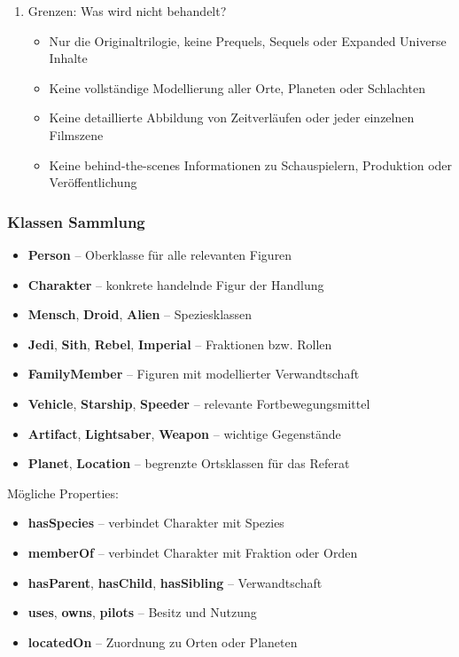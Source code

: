 \documentclass[a4paper]{article}
\begin{document}
\begin{enumerate}
        \item Grenzen: Was wird nicht behandelt? 
        
        \begin{itemize}
            \item Nur die Originaltrilogie, keine Prequels, Sequels oder Expanded Universe Inhalte
            \item Keine vollständige Modellierung aller Orte, Planeten oder Schlachten
            \item Keine detaillierte Abbildung von Zeitverläufen oder jeder einzelnen Filmszene
            \item Keine behind-the-scenes Informationen zu Schauspielern, Produktion oder Veröffentlichung
        \end{itemize}

    \end{enumerate}

\subsubsection{Klassen Sammlung}

\begin{itemize}
    \item \textbf{Person} -- Oberklasse für alle relevanten Figuren
    \item \textbf{Charakter} -- konkrete handelnde Figur der Handlung
    \item \textbf{Mensch}, \textbf{Droid}, \textbf{Alien} -- Speziesklassen
    \item \textbf{Jedi}, \textbf{Sith}, \textbf{Rebel}, \textbf{Imperial} -- Fraktionen bzw. Rollen
    \item \textbf{FamilyMember} -- Figuren mit modellierter Verwandtschaft
    \item \textbf{Vehicle}, \textbf{Starship}, \textbf{Speeder} -- relevante Fortbewegungsmittel
    \item \textbf{Artifact}, \textbf{Lightsaber}, \textbf{Weapon} -- wichtige Gegenstände
    \item \textbf{Planet}, \textbf{Location} -- begrenzte Ortsklassen für das Referat
\end{itemize}

Mögliche Properties:

\begin{itemize}
    \item \textbf{hasSpecies} -- verbindet Charakter mit Spezies
    \item \textbf{memberOf} -- verbindet Charakter mit Fraktion oder Orden
    \item \textbf{hasParent}, \textbf{hasChild}, \textbf{hasSibling} -- Verwandtschaft
    \item \textbf{uses}, \textbf{owns}, \textbf{pilots} -- Besitz und Nutzung
    \item \textbf{locatedOn} -- Zuordnung zu Orten oder Planeten
\end{itemize}
\end{document}
